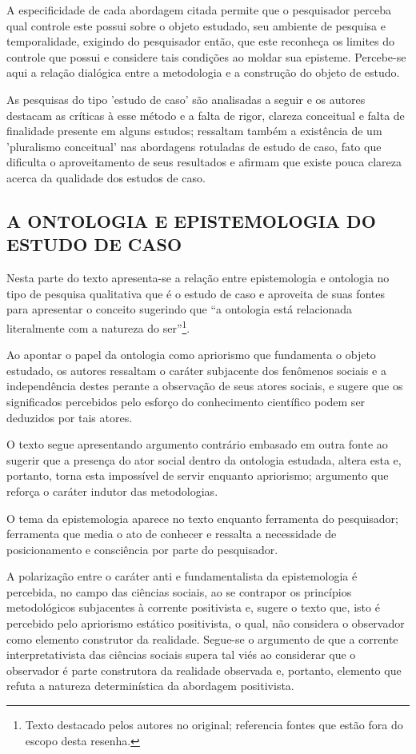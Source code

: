 \documentclass[
   article,       %
   12pt,          %
   oneside,       %
   a4paper,       %
   english,       %
   brazil,           %
   sumario=tradicional
   ]{abntex2}
\begin{document}
A especificidade de cada abordagem citada permite que o pesquisador perceba qual controle este possui sobre o objeto estudado, seu ambiente de pesquisa e temporalidade, exigindo do pesquisador então, que este reconheça os limites do controle que possui e considere tais condições ao moldar sua episteme. Percebe-se aqui a relação dialógica entre a metodologia e a construção do objeto de estudo.

As pesquisas do tipo 'estudo de caso' são analisadas a seguir e os autores destacam as críticas à esse método e a falta de rigor, clareza conceitual e falta de finalidade presente em alguns estudos; ressaltam também a existência de um 'pluralismo conceitual' nas abordagens rotuladas de estudo de caso, fato que dificulta o aproveitamento de seus resultados e afirmam que existe pouca clareza acerca da qualidade dos estudos de caso.


\subsection{A ONTOLOGIA E EPISTEMOLOGIA DO ESTUDO DE CASO}


Nesta parte do texto apresenta-se a relação entre epistemologia e ontologia no tipo de pesquisa qualitativa que é o estudo de caso e aproveita de suas fontes para apresentar o conceito sugerindo que “a ontologia está relacionada literalmente com a natureza do ser”\footnote{Texto destacado pelos autores no original; referencia fontes que estão fora do escopo desta resenha.}. 

Ao apontar o papel da ontologia como apriorismo que fundamenta o objeto estudado, os autores ressaltam o caráter subjacente dos fenômenos sociais e a independência destes perante a observação de seus atores sociais, e sugere que os significados percebidos pelo esforço do conhecimento científico podem ser deduzidos por tais atores.

O texto segue apresentando argumento contrário embasado em outra fonte ao sugerir que a presença do ator social dentro da ontologia estudada, altera esta e, portanto, torna esta impossível de servir enquanto apriorismo; argumento que reforça o caráter indutor das metodologias.

O tema da epistemologia aparece no texto enquanto ferramenta do pesquisador; ferramenta que media o ato de conhecer e ressalta a necessidade de posicionamento e consciência por parte do pesquisador.

A polarização entre o caráter anti e fundamentalista da epistemologia é percebida, no campo das ciências sociais, ao se contrapor os princípios metodológicos subjacentes à corrente positivista e, sugere o texto que, isto é percebido pelo apriorismo estático positivista, o qual, não considera o observador como elemento construtor da realidade. Segue-se o argumento de que a corrente interpretativista das ciências sociais supera tal viés ao considerar que o observador é parte construtora da realidade observada e, portanto, elemento que refuta a natureza determinística da abordagem positivista.
\end{document}
